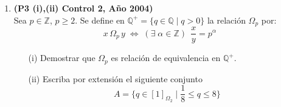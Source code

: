 \documentclass[10pt]{article}
\newcommand{\Q}{\mathbb Q}
\newcommand{\N}{\mathbb N}
\newcommand{\Z}{\mathbb Z}
\newcommand{\id}{\operatorname{Id}} %
\theoremstyle{plain}
\newcommand{\cur}[1]{\mathcal{#1}}
\theoremstyle{definition}
\begin{document}
\begin{enumerate}[label=\textbf{P\arabic*.-}]

\item \textbf{(P3 (i),(ii) Control 2, Año 2004)}\\
Sea $p\in\Z$, $p\geq 2$. Se define en $\Q^{+}=\{q\in\Q\;|\;q>0\}$ la relación $\Omega_{p}$ por:
$$ x\,\Omega_p \, y \; \Longleftrightarrow \; (\exists \; \alpha \in \Z) \;\, \frac{x}{y}=p^{\alpha}$$
\begin{enumerate}
\item[(i)] Demostrar que $\Omega_p$ es relación de equivalencia en $\Q^{+}$.
\item[(ii)] Escriba por extensión el siguiente conjunto
$$A=\{q\in[1]_{\Omega_2} \;|\; \frac{1}{8}\leq q \leq 8\}$$
\end{enumerate}



\end{enumerate}
\end{document}
